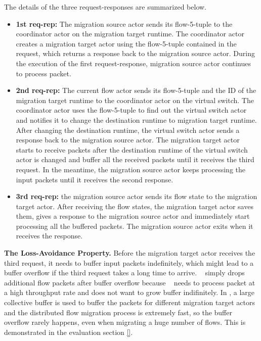 The details of the three request-responses are summarized below.
\begin{itemize}

\item \textbf{1st req-rep:} The migration source actor sends its flow-5-tuple to the coordinator actor on the migration target runtime. The coordinator actor creates a migration target actor using the flow-5-tuple contained in the request, which returns a response back to the migration source actor. During the execution of the first request-response, migration source actor continues to process packet.

\item \textbf{2nd req-rep:} The current flow actor sends its flow-5-tuple and the ID of the migration target runtime to the coordinator actor on the virtual switch. The coordinator actor uses the flow-5-tuple to find out the virtual switch actor and notifies it to change the destination runtime to migration target runtime. After changing the destination runtime, the virtual switch actor sends a response back to the migration source actor. The migration target actor starts to receive packets after the destination runtime of the virtual switch actor is changed and buffer all the received packets until it receives the third request. In the meantime, the migration source actor keeps processing the input packets until it receives the second response.

\item \textbf{3rd req-rep:} the migration source actor sends its flow state to the migration target actor. After receiving the flow states, the migration target actor saves them, gives a response to the migration source actor and immediately start processing all the buffered packets. The migration source actor exits when it receives the response.

\end{itemize}

\textbf{The Loss-Avoidance Property.} Before the migration target actor receives the third request, it needs to buffer input packets indefinitely, which might lead to a buffer overflow if the third request takes a long time to arrive. \nfactor~ simply drops additional flow packets after buffer overflow because \nfactor~ needs to process packet at a high throughput rate and does not want to grow buffer indifinitely. In \nfactor, a large collective buffer is used to buffer the packets for different migration target actors and the distributed flow migration process is extremely fast, so the buffer overflow rarely happens, even when migrating a huge number of flows. This is demonstrated in the evaluation section \ref{}.

